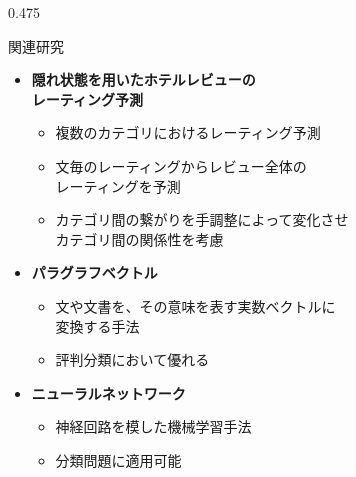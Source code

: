 \documentclass[unicode,10pt]{beamer}
\newcommand{\itemtitle}[1]{\textbf{#1}\\}
\newcommand{\columnsize}{0.475\textwidth}
\begin{document}
\begin{frame}
\begin{columns}[onlytextwidth,t]
\begin{column}{\columnsize}
  \begin{block}{関連研究}
    \begin{itemize}
      \item \itemtitle{隠れ状態を用いたホテルレビューの\\
                       レーティング予測\cite{fujitani15}}
        \begin{itemize}
          \item 複数のカテゴリにおけるレーティング予測
          \item 文毎のレーティングからレビュー全体の \\
                レーティングを予測
          \item カテゴリ間の繋がりを手調整によって変化させ \\
                カテゴリ間の関係性を考慮
        \end{itemize}
      \item \itemtitle{パラグラフベクトル\cite{quoc14}}
        \begin{itemize}
          \item 文や文書を、その意味を表す実数ベクトルに \\
                変換する手法
          \item 評判分類において優れる
        \end{itemize}
      \item \itemtitle{ニューラルネットワーク}
        \begin{itemize}
          \item 神経回路を模した機械学習手法
          \item 分類問題に適用可能
        \end{itemize}
    \end{itemize}
  \end{block}


\end{column}
\end{columns}
\end{frame}
\end{document}
